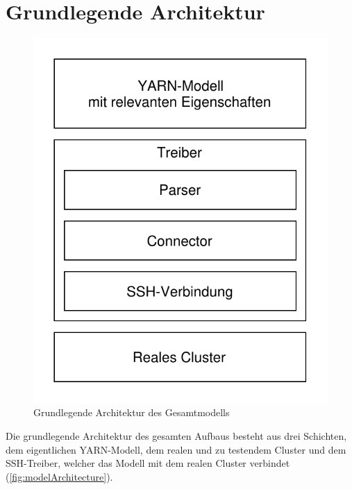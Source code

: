 \section{Grundlegende Architektur}\label{sec:architecture}


\begin{figure}
	\begin{center}
		\includegraphics[width=0.4\columnwidth]{./images/modelArchitecture.pdf}
	\end{center}
	\caption{Grundlegende Architektur des Gesamtmodells}
	\label{fig:modelArchitecture}
\end{figure}

Die grundlegende Architektur des gesamten Aufbaus besteht aus drei Schichten, dem eigentlichen YARN-Modell, dem realen und zu testendem Cluster und dem SSH-Treiber, welcher das Modell mit dem realen Cluster verbindet (\autoref{fig:modelArchitecture}).

